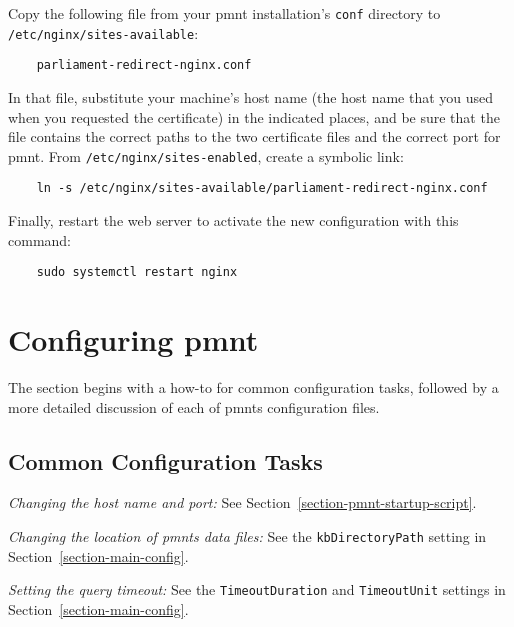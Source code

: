 Copy the following file from your \ac{pmnt} installation's \texttt{conf} directory to \texttt{/etc/nginx/sites-available}:

\begin{Verbatim}
	parliament-redirect-nginx.conf
\end{Verbatim}

In that file, substitute your machine's host name (the host name that you used when you requested the certificate) in the indicated places, and be sure that the file contains the correct paths to the two certificate files and the correct port for \ac{pmnt}.  From \texttt{/etc/nginx/sites-enabled}, create a symbolic link:

\begin{Verbatim}
	ln -s /etc/nginx/sites-available/parliament-redirect-nginx.conf
\end{Verbatim}

Finally, restart the web server to activate the new configuration with this command:

\begin{Verbatim}
	sudo systemctl restart nginx
\end{Verbatim}



\section{Configuring \ac{pmnt}}
\label{section-configuring-pmnt}

The section begins with a how-to for common configuration tasks, followed by a more detailed discussion of each of \acp{pmnt} configuration files.

\subsection{Common Configuration Tasks}
\label{section-common-config-tasks}

\emph{Changing the host name and port:} See Section~\ref{section-pmnt-startup-script}.

\emph{Changing the location of \acp{pmnt} data files:} See the \texttt{kbDirectoryPath} setting in Section~\ref{section-main-config}.

\emph{Setting the query timeout:} See the \texttt{TimeoutDuration} and \texttt{TimeoutUnit} settings in Section~\ref{section-main-config}.

